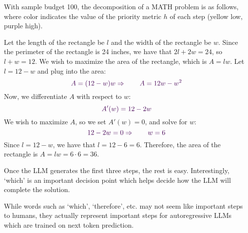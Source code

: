 With sample budget 100, the decomposition of a MATH problem is as follows, where color indicates the value of the priority metric $h$ of each step (yellow low, purple high).
\vspace{-0.2cm}  
\begin{tcolorbox}[colback=white, title=\decomp example decomposition, colframe=black, boxsep=0.1mm]
\scriptsize
\textcolor{high}{Let the length of the rectangle be \( l \)} 
    \textcolor{medium}{and the width of the rectangle be \( w \). Since the perimeter of the rectangle is 24 inches, we have that \( 2l + 2w = 24 \), so \( l + w = 12 \). We wish to maximize the area of the rectangle,}
    \textcolor{high}{which}
    \textcolor{low}{is \( A = lw \). Let \( l = 12 - w \) and plug into the area:}
    \[
    \textcolor{low}{A = (12 - w)w \Rightarrow \qquad A = 12w - w^2}
    \]
    \textcolor{low}{Now, we differentiate \( A \) with respect to \( w \):}
    \[
    \textcolor{low}{A'(w) = 12 - 2w}
    \]
    \textcolor{low}{We wish to maximize \( A \), so we set \( A'(w) = 0 \), and solve for \( w \):}
    \[
    \textcolor{low}{12 - 2w = 0 \Rightarrow \qquad w = 6}
    \]
    \textcolor{low}{Since \( l = 12 - w \), we have that \( l = 12 - 6 = 6 \). Therefore, the area of the rectangle is \( A = lw = 6 \cdot 6 = \boxed{36} \).}
\end{tcolorbox}
\vspace{-0.1cm}  
\normalsize
Once the LLM generates the first three steps, the rest is easy. Interestingly, `which' is an important decision point which helps decide how the LLM will complete the solution. 
\vspace{-0.2cm}  
\begin{tcolorbox}[title=Takeaway: Autoregressive models require autoregressive decomposition,boxsep=0.5mm, colframe=low,]\footnotesize{
    While words such as `which', `therefore', etc. may not seem like important steps to humans, they actually represent important steps for autoregressive LLMs which are trained on next token prediction.}
\end{tcolorbox}
\vspace{-0.2cm}  